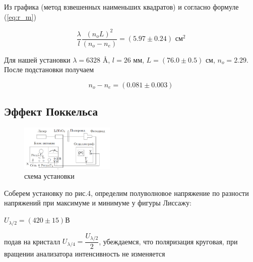 \documentclass{article}
\begin{document}
Из графика (метод взвешенных наименьших квадратов) и согласно формуле (\ref{eq:r_m})

\begin{equation*}
    \frac{\lambda}{l} \frac{{(n_o L)}^2}{(n_o - n_e)} = (5.97 \pm 0.24) \text{ см}^2
\end{equation*}

Для нашей установки $\lambda = 6328$ \AA, $l = 26$ мм, $L = (76.0 \pm 0.5)$ см,
$n_o = 2.29$. После подстановки получаем

\begin{equation}
    n_o - n_e = (0.081 \pm 0.003)
\end{equation}
\newpage
\subsection{Эффект Поккельса}
\begin{figure}
    \begin{center}
      \includegraphics[width=0.4\textwidth]{image.png}
    \end{center}
    \caption{схема установки}
\end{figure}
Соберем установку по рис.4, определим полуволновое напряжение по разности 
напряжений при максимуме и минимуме у фигуры Лиссажу:

$U_{\lambda/2} = (420 \pm 15)$В

подав на кристалл $U_{\lambda/4} = \dfrac{U_{\lambda/2}}{2}$, убеждаемся, что поляризация круговая, при вращении анализатора интенсивность не изменяется
\end{document}

